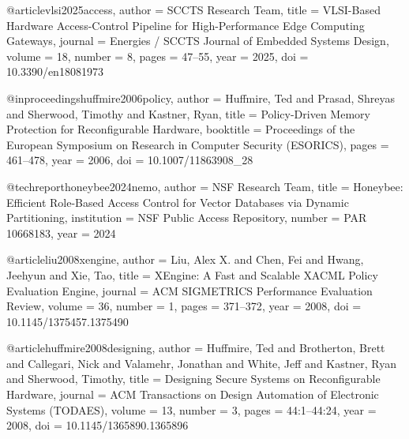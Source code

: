 @article{vlsi2025access,
  author    = {{SCCTS Research Team}},
  title     = {{VLSI}-Based Hardware Access-Control Pipeline for High-Performance Edge Computing Gateways},
  journal   = {Energies / SCCTS Journal of Embedded Systems Design},
  volume    = {18},
  number    = {8},
  pages     = {47--55},
  year      = {2025},
  doi       = {10.3390/en18081973}
}

@inproceedings{huffmire2006policy,
  author    = {Huffmire, Ted and Prasad, Shreyas and Sherwood, Timothy and Kastner, Ryan},
  title     = {Policy-Driven Memory Protection for Reconfigurable Hardware},
  booktitle = {Proceedings of the European Symposium on Research in Computer Security (ESORICS)},
  pages     = {461--478},
  year      = {2006},
  doi       = {10.1007/11863908_28}
}

@techreport{honeybee2024nemo,
  author    = {{NSF Research Team}},
  title     = {Honeybee: Efficient Role-Based Access Control for Vector Databases via Dynamic Partitioning},
  institution = {NSF Public Access Repository},
  number    = {PAR 10668183},
  year      = {2024}
}

@article{liu2008xengine,
  author    = {Liu, Alex X. and Chen, Fei and Hwang, Jeehyun and Xie, Tao},
  title     = {{XEngine}: A Fast and Scalable {XACML} Policy Evaluation Engine},
  journal   = {ACM SIGMETRICS Performance Evaluation Review},
  volume    = {36},
  number    = {1},
  pages     = {371--372},
  year      = {2008},
  doi       = {10.1145/1375457.1375490}
}

@article{huffmire2008designing,
  author    = {Huffmire, Ted and Brotherton, Brett and Callegari, Nick and Valamehr, Jonathan and White, Jeff and Kastner, Ryan and Sherwood, Timothy},
  title     = {Designing Secure Systems on Reconfigurable Hardware},
  journal   = {ACM Transactions on Design Automation of Electronic Systems (TODAES)},
  volume    = {13},
  number    = {3},
  pages     = {44:1--44:24},
  year      = {2008},
  doi       = {10.1145/1365890.1365896}
}